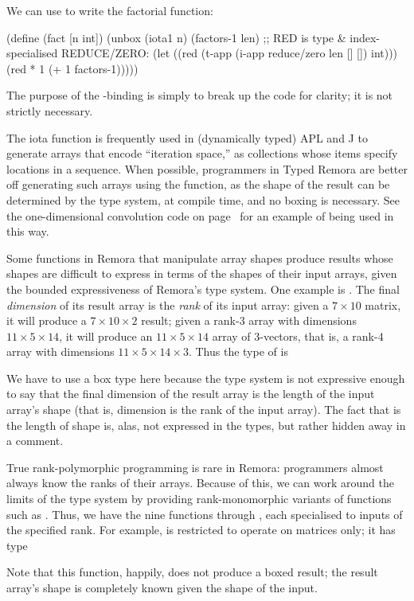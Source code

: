 We can use  to write the factorial function:
\begin{code}
(define (fact [n int])
  (unbox (iota1 n) (factors-1 len)
    ;; RED is type & index-specialised REDUCE/ZERO:
    (let ((red (t-app (i-app reduce/zero len [] []) int)))
      (red * 1 (+ 1 factors-1)))))\end{code}
The purpose of the -binding is simply to break up
the code for clarity; it is not strictly necessary.

The iota function is frequently used in (dynamically typed) APL and J
to generate arrays that encode ``iteration space,''
as collections whose items specify locations in a sequence.
When possible, programmers in Typed Remora are better off generating
such arrays using the  function,
as the shape of the result can be determined by the type system,
at compile time, and no boxing is necessary.
See the one-dimensional convolution code on page~\pageref{example:convolve1}
for an example of  being used in this way.

Some functions in Remora that manipulate array shapes produce results
whose shapes are difficult to express in terms of the shapes of their
input arrays, given the bounded expressiveness of Remora's type
system.
One example is .
The final \emph{dimension} of its result array is 
the \emph{rank} of its input array:
given a $7 \times 10$ matrix,
it will produce a $7 \times 10 \times 2$ result;
given a rank-3 array with dimensions $11 \times 5 \times 14$,
it will produce an $11 \times 5 \times 14$ array of 3-vectors,
that is,
a rank-4 array with dimensions $11 \times 5 \times 14 \times 3$.
Thus the type of  is
\begin{code}
\end{code}
We have to use a box type here because the type system is not
expressive enough to say that the final dimension  of the
result array is the length of the input array's shape 
(that is, dimension  is the rank of the input array).
The fact that  is the length of shape  is, alas,
not expressed in the types, but rather hidden away in a comment.

True rank-polymorphic programming is rare in Remora:
programmers almost always know the ranks of their arrays.
Because of this, we can work around the limits of the type system
by providing rank-monomorphic variants of functions such as
.
Thus, we have the nine functions  through
, each specialised to inputs of the specified rank.
For example,  is restricted to operate on matrices
only; it has type
\begin{code}
\end{code}
Note that this function, happily, does not produce a boxed result;
the result array's shape is completely known given the shape of the
input.

